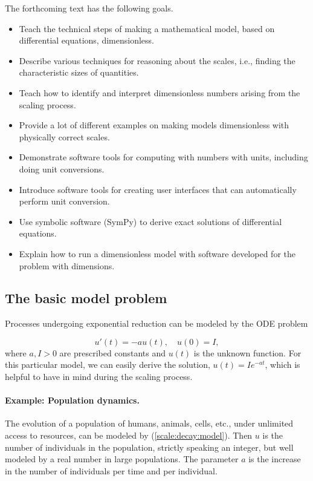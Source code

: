 \documentclass[graybox,envcountchap,sectrefs,final]{svmonodo}
\begin{document}
The forthcoming text has the following goals.

\begin{itemize}
 \item Teach the technical steps of making a mathematical model, based
   on differential equations, dimensionless.

 \item Describe various techniques for reasoning about the scales, i.e.,
   finding the characteristic sizes of quantities.

 \item Teach how to identify and interpret dimensionless numbers arising
   from the scaling process.

 \item Provide a lot of different examples on making models dimensionless
   with physically correct scales.

 \item Demonstrate software tools for computing with numbers with units,
   including doing unit conversions.

 \item Introduce software tools for creating user interfaces that
   can automatically perform unit conversion.

 \item Use symbolic software (SymPy) to derive exact solutions of differential
   equations.

 \item Explain how to run a dimensionless model with software developed
   for the problem with dimensions.
\end{itemize}

\noindent
\subsection{The basic model problem}

Processes undergoing exponential reduction can be modeled by the ODE
problem

\begin{equation}
u'(t) = -au(t),\quad u(0)=I,
\label{scale:decay:model}
\end{equation}
where $a,I>0$ are prescribed constants and $u(t)$ is the unknown function.
For this particular model, we can easily derive the solution, $u(t)=Ie^{-at}$,
which is helpful to have in mind during the scaling process.

\paragraph{Example: Population dynamics.}
The evolution of a population of humans, animals, cells, etc.,
under unlimited access to resources, can be
modeled by (\ref{scale:decay:model}). Then $u$ is the number of
individuals in the population, strictly speaking an integer, but well
modeled by a real number in large populations.
The parameter $a$ is the increase in the number of individuals per
time and per individual.
\end{document}
